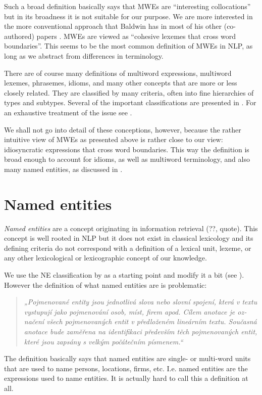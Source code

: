 Such a broad definition basically says that MWEs are ``interesting collocations'' but in its broadness it is not suitable for our purpose. We are more interested in the more conventional approach that Baldwin has in most of his other (co-authored) papers \citep{baldwin:2003,sag:2002}. MWEs are viewed as ``cohesive lexemes that cross word boundaries''. This seems to be the most common definition of MWEs in NLP, as long as we abstract from differences in terminology.

There are of course many definitions of multiword expressions, multiword lexemes, phrasemes, idioms, and many other concepts that are more or less closely related. They are classified by many criteria, often into fine hierarchies of types and subtypes. Several of the important classifications are presented in \citet{pecina:2009}. For an exhaustive treatment of the issue see \citet{cermak:2010}. 

We shall not go into detail of these conceptions, however, because the rather intuitive view of MWEs as presented above is rather close to our view: idiosyncratic expressions that cross word boundaries. This way the definition is broad enough to account for idioms, as well as multiword terminology, and also many named entities, as discussed in .


\section{Named entities}
\label{mwe:ne}
\emph{Named entities} are a concept originating in information retrieval (??, quote). This concept is well rooted in NLP but it does not exist in classical lexicology and its defining criteria do not correspond with a definition of a lexical unit, lexeme, or any other lexicological or lexicographic concept of our knowledge.

We use the NE classification by \citet{sevcikova:2007} as a starting point and modify it a bit (see ). However the definition of what named entities are is problematic:
\begin{quote}
\textczech{\em „Pojmenované entity jsou jednotlivá slova nebo slovní spojení, která v textu vystupují jako
pojmenování osob, míst, firem apod. Cílem anotace je označení všech pojmenovaných entit v 
předloženém lineárním textu. Současná anotace bude zaměřena na identifikaci
především těch pojmenovaných entit, které jsou zapsány s velkým počátečním písmenem.“}
\end{quote}
The definition basically says that named entities are single- or multi-word units that are used to name persons, locations, firms, etc. I.e. named entities are the expressions used to name entities. It is actually hard to call this a definition at all.

